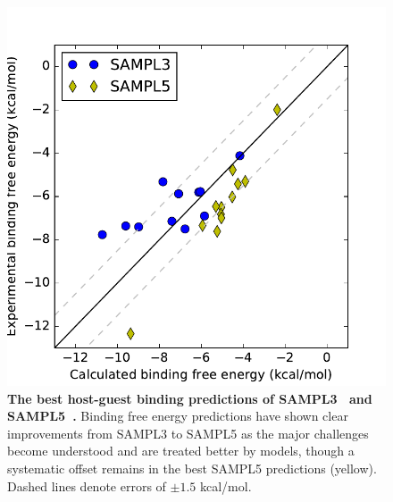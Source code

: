 \documentclass[11pt]{article}
\begin{document}
\begin{figure}
\vspace{-0.25in}
\begin{centering}
\includegraphics[width=\textwidth]{figures/sampl3_and_sampl5.pdf}

\end{centering}
\footnotesize
\caption{\label{figure:hg_sampl}  
\textbf{The best host-guest binding predictions of SAMPL3~\cite{muddana_sampl3_2012} and SAMPL5~\cite{yin_sampl5_2016}.} 
Binding free energy predictions have shown clear improvements from SAMPL3 to SAMPL5 as the major challenges become understood and are treated better by models, though a systematic offset remains in the best SAMPL5 predictions (yellow). Dashed lines denote errors of $\pm1.5$ kcal/mol.
}
\end{figure}
\end{document}
